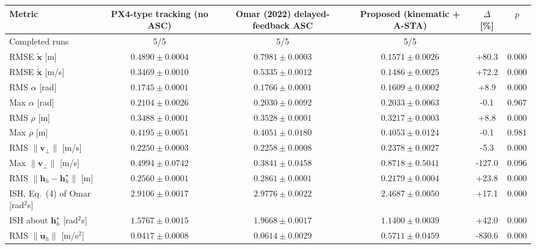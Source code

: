 
\begin{tabular}{lccccc}
\toprule
Metric & PX4-type tracking (no ASC) & Omar (2022) delayed-feedback ASC & Proposed (kinematic + A-STA) & $\Delta$ [\%] & $p$ \\
\midrule
Completed runs & 5/5 & 5/5 & 5/5 & & \\
RMSE $\tilde{\mathbf{x}}$ [m] & $0.4890 \pm 0.0004$ & $0.7981 \pm 0.0003$ & $0.1571 \pm 0.0026$ & +80.3 & 0.000 \\
RMSE $\dot{\tilde{\mathbf{x}}}$ [m/s] & $0.3469 \pm 0.0010$ & $0.5335 \pm 0.0012$ & $0.1486 \pm 0.0025$ & +72.2 & 0.000 \\
RMS $\alpha$ [rad] & $0.1745 \pm 0.0001$ & $0.1766 \pm 0.0001$ & $0.1609 \pm 0.0002$ & +8.9 & 0.000 \\
Max $\alpha$ [rad] & $0.2104 \pm 0.0026$ & $0.2030 \pm 0.0092$ & $0.2033 \pm 0.0063$ & -0.1 & 0.967 \\
RMS $\rho$ [m] & $0.3488 \pm 0.0001$ & $0.3528 \pm 0.0001$ & $0.3217 \pm 0.0003$ & +8.8 & 0.000 \\
Max $\rho$ [m] & $0.4195 \pm 0.0051$ & $0.4051 \pm 0.0180$ & $0.4053 \pm 0.0124$ & -0.1 & 0.981 \\
RMS $\|\mathbf{v}_\perp\|$ [m/s] & $0.2250 \pm 0.0003$ & $0.2258 \pm 0.0008$ & $0.2378 \pm 0.0027$ & -5.3 & 0.000 \\
Max $\|\mathbf{v}_\perp\|$ [m/s] & $0.4994 \pm 0.0742$ & $0.3841 \pm 0.0458$ & $0.8718 \pm 0.5041$ & -127.0 & 0.096 \\
RMS $\|\mathbf{h}_h-\mathbf{h}^\star_h\|$ [m] & $0.2560 \pm 0.0001$ & $0.2861 \pm 0.0001$ & $0.2179 \pm 0.0004$ & +23.8 & 0.000 \\
ISH, Eq.~(4) of Omar [rad$^2$s] & $2.9106 \pm 0.0017$ & $2.9776 \pm 0.0022$ & $2.4687 \pm 0.0050$ & +17.1 & 0.000 \\
ISH about $\mathbf{h}^\star_h$ [rad$^2$s] & $1.5767 \pm 0.0015$ & $1.9668 \pm 0.0017$ & $1.1400 \pm 0.0039$ & +42.0 & 0.000 \\
RMS $\|\dot{\mathbf{u}}_h\|$ [m/s$^2$] & $0.0417 \pm 0.0008$ & $0.0614 \pm 0.0029$ & $0.5711 \pm 0.0459$ & -830.6 & 0.000 \\
\bottomrule
\end{tabular}

